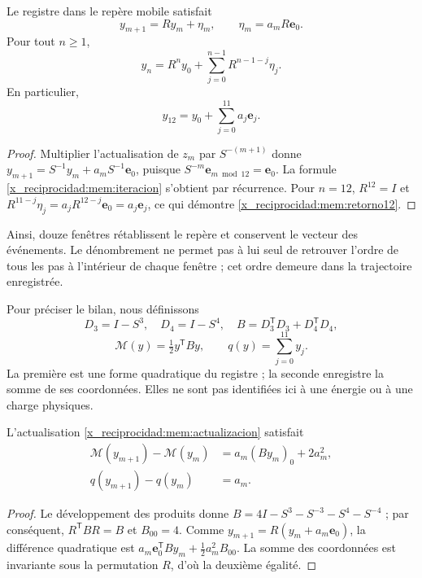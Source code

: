 \begin{proposition}
\label{x_reciprocidad:mem:prop-actualizacion}
Le registre dans le repère mobile satisfait
\begin{equation}
 y_{m+1}=Ry_m+\eta_m,\qquad
 \eta_m=a_mR\mathbf e_0.
 \label{x_reciprocidad:mem:actualizacion}
\end{equation}
Pour tout \(n\geq1\),
\begin{equation}
 y_n=R^ny_0+\sum_{j=0}^{n-1}R^{n-1-j}\eta_j.
 \label{x_reciprocidad:mem:iteracion}
\end{equation}
En particulier,
\begin{equation}
 y_{12}=y_0+\sum_{j=0}^{11}a_j\mathbf e_j.
 \label{x_reciprocidad:mem:retorno12}
\end{equation}
\end{proposition}
\begin{proof}
Multiplier l'actualisation de \(z_m\) par \(S^{-(m+1)}\) donne
\(y_{m+1}=S^{-1}y_m+a_mS^{-1}\mathbf e_0\), puisque
\(S^{-m}\mathbf e_{m\bmod12}=\mathbf e_0\).
La formule \eqref{x_reciprocidad:mem:iteracion} s'obtient par récurrence.
Pour \(n=12\), \(R^{12}=I\) et
\(R^{11-j}\eta_j=a_jR^{12-j}\mathbf e_0=a_j\mathbf e_j\),
ce qui démontre \eqref{x_reciprocidad:mem:retorno12}.
\end{proof}

Ainsi, douze fenêtres rétablissent le repère et conservent le vecteur des événements.
Le dénombrement ne permet pas à lui seul de retrouver l'ordre de tous les pas
à l'intérieur de chaque fenêtre ; cet ordre demeure dans la trajectoire enregistrée.

Pour préciser le bilan, nous définissons
\[
 D_3=I-S^3,\quad D_4=I-S^4,\quad
 B=D_3^{\mathsf T}D_3+D_4^{\mathsf T}D_4,
\]
\[
 \mathcal M(y)=\tfrac12y^{\mathsf T}By,
 \qquad q(y)=\sum_{j=0}^{11}y_j.
\]
La première est une forme quadratique du registre ; la seconde enregistre
la somme de ses coordonnées. Elles ne sont pas identifiées ici à une énergie ou à une charge physiques.

\begin{proposition}
\label{x_reciprocidad:mem:prop-balance}
L'actualisation \eqref{x_reciprocidad:mem:actualizacion} satisfait
\begin{equation}
 \begin{aligned}
 \mathcal M(y_{m+1})-\mathcal M(y_m)
   &=a_m(By_m)_0+2a_m^2,\\
 q(y_{m+1})-q(y_m)&=a_m.
 \end{aligned}
 \label{x_reciprocidad:mem:balance}
\end{equation}
\end{proposition}
\begin{proof}
Le développement des produits donne
\(B=4I-S^3-S^{-3}-S^4-S^{-4}\) ; par conséquent,
\(R^{\mathsf T}BR=B\) et \(B_{00}=4\).
Comme \(y_{m+1}=R(y_m+a_m\mathbf e_0)\), la différence quadratique
est \(a_m\mathbf e_0^{\mathsf T}By_m+\tfrac12a_m^2B_{00}\).
La somme des coordonnées est invariante sous la permutation \(R\),
d'où la deuxième égalité.
\end{proof}

